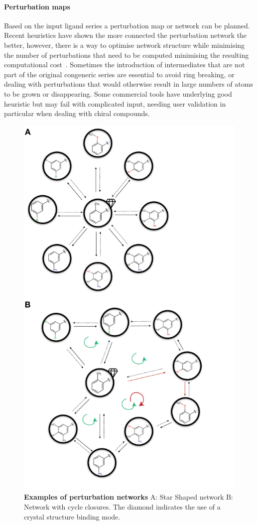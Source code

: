 \documentclass[9pt,bestpractices]{livecoms}
\begin{document}
\paragraph{Perturbation maps}
Based on the input ligand series a perturbation map or network can be planned. Recent heuristics have shown the more connected the perturbation network the better, however, there is a way to optimise network structure while minimising the number of perturbations that need to be computed minimising the resulting computational cost~\cite{yang2019optimal}. Sometimes the introduction of intermediates that are not part of the original congeneric series are essential to avoid ring breaking, or dealing with perturbations that would otherwise result in large numbers of atoms to be grown or disappearing. Some commercial tools have underlying good heuristic but may fail with complicated input, needing user validation in particular when dealing with chiral compounds. 
\begin{figure}[h!]
    \includegraphics[width=0.95\columnwidth]{figures/fig6_types_of_networks/Figure.pdf}
    \caption{\textbf{Examples of perturbation networks} A: Star Shaped network B: Network with cycle closures. The diamond indicates the use of a crystal structure binding mode.}
    \label{fig:fig_types_of_networks}
\end{figure} 
\end{document}
